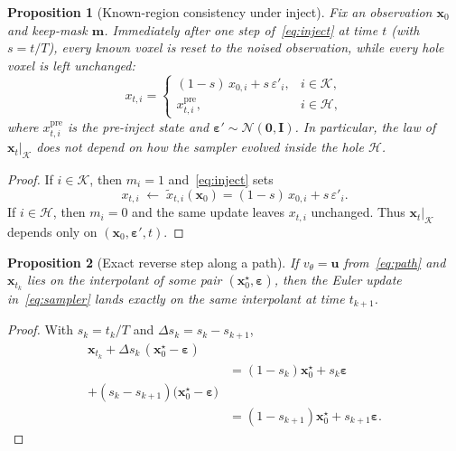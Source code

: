 \documentclass[twoside]{article}
\newtheorem{proposition}{Proposition}
\begin{document}
\begin{proposition}[Known-region consistency under inject]
\label{prop:inject}
Fix an observation \(\mathbf{x}_0\) and keep-mask \(\mathbf{m}\).
Immediately after one step of~\eqref{eq:inject} at time \(t\)
(with \(s=t/T\)), every known voxel is reset to the noised observation,
while every hole voxel is left unchanged:
\begin{equation*}
x_{t,i}
=
\begin{cases}
(1-s)\,x_{0,i}+s\,\varepsilon'_i,
  & i\in\mathcal{K},\\[2pt]
x_{t,i}^{\mathrm{pre}},
  & i\in\mathcal{H},
\end{cases}
\end{equation*}
where \(x_{t,i}^{\mathrm{pre}}\) is the pre-inject state and
\(\boldsymbol{\varepsilon}'\sim\mathcal{N}(\mathbf{0},\mathbf{I})\).
In particular, the law of \(\mathbf{x}_t\big|_{\mathcal{K}}\) does not
depend on how the sampler evolved inside the hole \(\mathcal{H}\).
\end{proposition}
\begin{proof}
If \(i\in\mathcal{K}\), then \(m_i=1\) and~\eqref{eq:inject} sets
\begin{equation*}
x_{t,i}
\;\leftarrow\;
\tilde{x}_{t,i}(\mathbf{x}_0)
=
(1-s)\,x_{0,i}+s\,\varepsilon'_i.
\end{equation*}
If \(i\in\mathcal{H}\), then \(m_i=0\) and the same update leaves
\(x_{t,i}\) unchanged.
Thus \(\mathbf{x}_t\big|_{\mathcal{K}}\) depends only on
\((\mathbf{x}_0,\boldsymbol{\varepsilon}',t)\).
\end{proof}

\begin{proposition}[Exact reverse step along a path]
\label{prop:euler}
If \(v_\theta=\mathbf{u}\) from~\eqref{eq:path} and \(\mathbf{x}_{t_k}\)
lies on the interpolant of some pair
\((\mathbf{x}_0^\star,\boldsymbol{\varepsilon})\), then the Euler update
in~\eqref{eq:sampler} lands exactly on the same interpolant at time
\(t_{k+1}\).
\end{proposition}
\begin{proof}
With \(s_k=t_k/T\) and \(\Delta s_k=s_k-s_{k+1}\),
\begin{align*}
\mathbf{x}_{t_k}+\Delta s_k\,(\mathbf{x}_0^\star-\boldsymbol{\varepsilon})\\
&=
(1-s_k)\mathbf{x}_0^\star+s_k\boldsymbol{\varepsilon}\\
+(s_k-s_{k+1})\bigl(\mathbf{x}_0^\star-\boldsymbol{\varepsilon}\bigr)\\
&=
(1-s_{k+1})\mathbf{x}_0^\star+s_{k+1}\boldsymbol{\varepsilon}.
\end{align*}
\end{proof}
\end{document}
